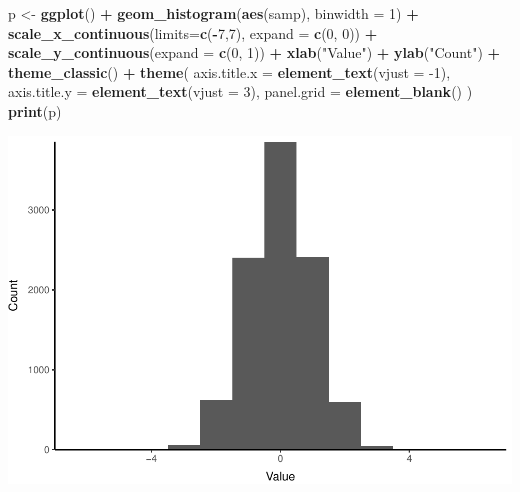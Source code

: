 \documentclass[
]{book}
\newenvironment{Shaded}{\begin{snugshade}}{\end{snugshade}}
\newcommand{\DataTypeTok}[1]{\textcolor[rgb]{0.13,0.29,0.53}{#1}}
\newcommand{\DecValTok}[1]{\textcolor[rgb]{0.00,0.00,0.81}{#1}}
\newcommand{\KeywordTok}[1]{\textcolor[rgb]{0.13,0.29,0.53}{\textbf{#1}}}
\newcommand{\NormalTok}[1]{#1}
\newcommand{\OperatorTok}[1]{\textcolor[rgb]{0.81,0.36,0.00}{\textbf{#1}}}
\newcommand{\StringTok}[1]{\textcolor[rgb]{0.31,0.60,0.02}{#1}}
\begin{document}
\begin{Shaded}
\begin{Highlighting}[]
\NormalTok{p <-}\StringTok{ }\KeywordTok{ggplot}\NormalTok{() }\OperatorTok{+}\StringTok{ }
\StringTok{  }\KeywordTok{geom_histogram}\NormalTok{(}\KeywordTok{aes}\NormalTok{(samp), }\DataTypeTok{binwidth =} \DecValTok{1}\NormalTok{) }\OperatorTok{+}\StringTok{ }
\StringTok{  }\KeywordTok{scale_x_continuous}\NormalTok{(}\DataTypeTok{limits=}\KeywordTok{c}\NormalTok{(}\OperatorTok{-}\DecValTok{7}\NormalTok{,}\DecValTok{7}\NormalTok{), }\DataTypeTok{expand =} \KeywordTok{c}\NormalTok{(}\DecValTok{0}\NormalTok{, }\DecValTok{0}\NormalTok{)) }\OperatorTok{+}\StringTok{ }
\StringTok{  }\KeywordTok{scale_y_continuous}\NormalTok{(}\DataTypeTok{expand =} \KeywordTok{c}\NormalTok{(}\DecValTok{0}\NormalTok{, }\DecValTok{1}\NormalTok{)) }\OperatorTok{+}\StringTok{ }
\StringTok{  }\KeywordTok{xlab}\NormalTok{(}\StringTok{"Value"}\NormalTok{) }\OperatorTok{+}
\StringTok{  }\KeywordTok{ylab}\NormalTok{(}\StringTok{"Count"}\NormalTok{) }\OperatorTok{+}
\StringTok{  }\KeywordTok{theme_classic}\NormalTok{() }\OperatorTok{+}
\StringTok{  }\KeywordTok{theme}\NormalTok{(}
    \DataTypeTok{axis.title.x =} \KeywordTok{element_text}\NormalTok{(}\DataTypeTok{vjust =} \DecValTok{-1}\NormalTok{),}
    \DataTypeTok{axis.title.y =} \KeywordTok{element_text}\NormalTok{(}\DataTypeTok{vjust =} \DecValTok{3}\NormalTok{),}
    \DataTypeTok{panel.grid =} \KeywordTok{element_blank}\NormalTok{()}
\NormalTok{  )}
\KeywordTok{print}\NormalTok{(p)}
\end{Highlighting}
\end{Shaded}

\includegraphics{worstr_files/figure-latex/unnamed-chunk-117-1.pdf}
\end{document}
